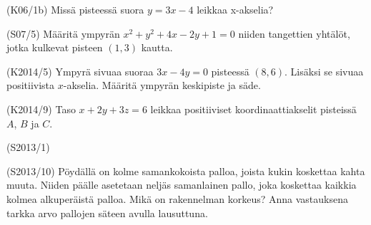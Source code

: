 \begin{tehtava}(K06/1b)
	Missä pisteessä suora $y=3x-4$ leikkaa x-akselia? 
\end{tehtava}

\begin{tehtava} (S07/5)
	Määritä ympyrän $x^2+y^2+4x-2y+1=0$ niiden tangettien yhtälöt, jotka kulkevat pisteen $(1,3)$ kautta.
\end{tehtava}



\begin{tehtava}(K2014/5)
Ympyrä sivuaa suoraa $3x-4y=0$ pisteessä $(8,6)$. Lisäksi se sivuaa positiivista $x$-akselia.
Määritä ympyrän keskipiste ja säde. 
\end{tehtava}


\begin{tehtava}(K2014/9)
Taso $x+2y+3z=6$ leikkaa positiiviset koordinaattiakselit pisteissä $A$, $B$ ja $C$.
\begin{alakohdat}
	\end{alakohdat}
\end{tehtava}

\begin{tehtava} (S2013/1)

\begin{alakohdat}
	\end{alakohdat}
\end{tehtava}

\begin{tehtava}(S2013/10)
Pöydällä on kolme samankokoista palloa, joista kukin koskettaa kahta muuta. Niiden päälle asetetaan neljäs samanlainen  pallo, joka koskettaa kaikkia kolmea alkuperäistä palloa.
Mikä on rakennelman korkeus? Anna vastauksena tarkka arvo pallojen säteen avulla lausuttuna. 
\end{tehtava}

